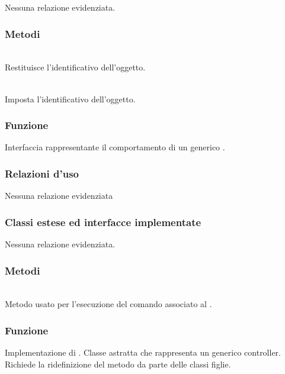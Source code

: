 Nessuna relazione evidenziata.

\subsubsection*{Metodi}
\begin{description}
	\item{}\\
	Restituisce l'identificativo dell'oggetto.
	\item{}\\
	Imposta l'identificativo dell'oggetto.
\end{description}


\subsubsection*{Funzione}
Interfaccia rappresentante il comportamento di un generico .

\subsubsection*{Relazioni d'uso}

Nessuna relazione evidenziata

\subsubsection*{Classi estese ed interfacce implementate}

Nessuna relazione evidenziata.

\subsubsection*{Metodi}
\begin{description}
	\item{}\\
	Metodo usato per l'esecuzione del comando associato al .
\end{description}


\subsubsection*{Funzione}
Implementazione di . Classe astratta che rappresenta un generico controller. Richiede la ridefinizione del metodo  da parte delle classi figlie.

